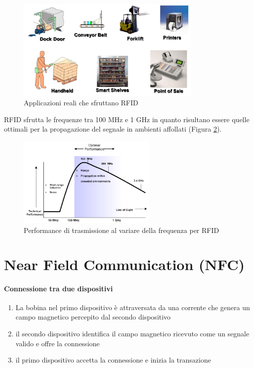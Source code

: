 	\begin{figure}
		\centering
		\includegraphics[width=0.8\textwidth]{lez7/useCasesRFID.png}
		\caption{Applicazioni reali che sfruttano RFID}
		\label{fig:useCasesRFID}
	\end{figure}

	RFID sfrutta le frequenze tra 100 MHz e 1 GHz in quanto risultano essere quelle ottimali per la propagazione del segnale in ambienti affollati (Figura \ref{fig:frequenzaOttimale}).
	
	\begin{figure}
		\centering
		\includegraphics[width=0.6\textwidth]{lez7/optimalFrequency.png}
		\caption{Performance di trasmissione al variare della frequenza per RFID}
		\label{fig:frequenzaOttimale}
	\end{figure}


\section{Near Field Communication (NFC)}

	\paragraph{Connessione tra due dispositivi}
	\begin{enumerate}
		\item La bobina nel primo dispositivo è attraversata da una corrente che genera un campo magnetico percepito dal secondo dispositivo
		\item il secondo dispositivo identifica il campo magnetico ricevuto come un segnale valido e offre la connessione
		\item il primo dispositivo accetta la connessione e inizia la transazione
	\end{enumerate}

